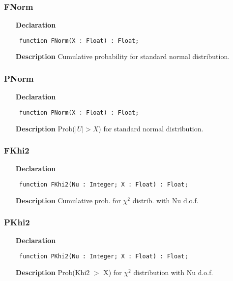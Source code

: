 \documentclass[12pt,a4paper,oneside]{report}
\newcommand{\declarationitem}[1]{\textbf{#1}}
\newcommand{\descriptiontitle}[1]{\textbf{#1}}
\newcommand{\code}[1]{\texttt{#1}}
\begin{document}
\subsubsection{FNorm}
\label{uigmdist-FNorm}
\begin{itemize}\item[\declarationitem{Declaration}\hfill]
	\begin{flushleft}
		\code{
			function FNorm(X : Float) : Float;}
	\end{flushleft}
	\item[\descriptiontitle{Description}]
	Cumulative probability for standard normal distribution.
\end{itemize}
\subsubsection{PNorm}
\label{uigmdist-PNorm}
\begin{itemize}\item[\declarationitem{Declaration}\hfill]
	\begin{flushleft}
		\code{
			function PNorm(X : Float) : Float;}
	\end{flushleft}
	\item[\descriptiontitle{Description}]
	Prob($|U| > X$) for standard normal distribution.
\end{itemize}
\subsubsection{FKhi2}
\label{uigmdist-FKhi2}
\begin{itemize}\item[\declarationitem{Declaration}\hfill]
	\begin{flushleft}
		\code{
			function FKhi2(Nu : Integer; X : Float) : Float;}
	\end{flushleft}
	\item[\descriptiontitle{Description}]
	Cumulative prob. for $\chi^2$ distrib. with Nu d.o.f.
\end{itemize}
\subsubsection{PKhi2}
\label{uigmdist-PKhi2}
\begin{itemize}\item[\declarationitem{Declaration}\hfill]
	\begin{flushleft}
		\code{
			function PKhi2(Nu : Integer; X : Float) : Float;}
	\end{flushleft}
	\item[\descriptiontitle{Description}]
	Prob(Khi2 {$>$} X) for $\chi^2$ distribution with Nu d.o.f.
\end{itemize}
\end{document}
